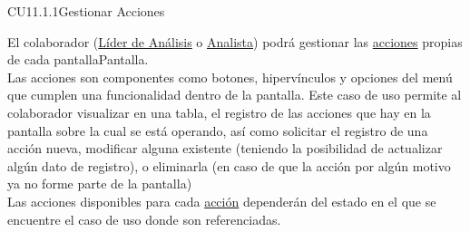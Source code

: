 	\begin{UseCase}{CU11.1.1}{Gestionar Acciones}{
		
		El colaborador (\hyperlink{jefe}{Líder de Análisis} o \hyperlink{analista}{Analista}) podrá gestionar las \hyperlink{EntidadAccion}{acciones} propias de cada {pantalla}{Pantalla}.\\
		
		Las acciones son componentes como botones, hipervínculos y opciones del menú que cumplen una funcionalidad dentro de la pantalla. Este caso de uso permite al colaborador visualizar en una tabla, el registro de las acciones que hay en la pantalla sobre la cual se está operando, así como solicitar el registro de una acción nueva, modificar alguna existente (teniendo la posibilidad de actualizar algún dato de registro), o eliminarla (en caso de que la acción por algún motivo ya no forme parte de la pantalla)\\
			
     	Las acciones disponibles para cada \hyperlink{EntidadAccion}{acción} dependerán del estado en el que se encuentre el caso de uso donde son referenciadas. 

	}
	
\end{UseCase}
